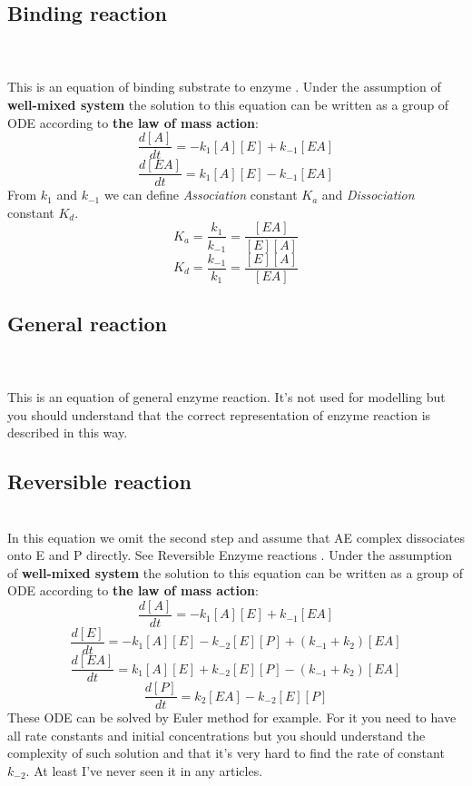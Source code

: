 \documentclass[twoside,twocolumn]{article}
\begin{document}
\subsection{Binding reaction}
\label{subsec:enzyme_binding}
\\\\This is an equation of binding substrate to enzyme \cite[p.~135]{sterratt_principles_2011}. Under the assumption of \textbf{well-mixed system}\cite[p.~135]{sterratt_principles_2011} the solution to this equation can be written as a group of ODE according to \textbf{the law of mass action}\cite[p.~10]{bisswanger_enzyme_2002}:
\[ \frac{d[A]}{dt} = -k_{1}[A][E] + k_{-1}[EA]\]
\[ \frac{d[EA]}{dt} = k_{1}[A][E] - k_{-1}[EA]\]
From $k_{1}$ and $k_{-1}$ we can define \textit{Association} constant $K_{a}$ and \textit{Dissociation} constant $K_{d}$.
\[ K_{a} = \frac{k_{1}}{k_{-1}} = \frac{[EA]}{[E][A]} \]
\[ K_{d} = \frac{k_{-1}}{k_{1}} = \frac{[E][A]}{[EA]} \]

\subsection{General reaction}
\label{subsec:enzyme_general}
\\\\This is an equation of general enzyme reaction. It's not used for modelling but you should understand that the correct representation of enzyme reaction is described in this way. 

\subsection{Reversible reaction}
\label{subsec:enzyme_reversible}
\\In this equation we omit the second step and assume that AE complex dissociates onto E and P directly. See Reversible Enzyme reactions \cite[p.~75]{bisswanger_enzyme_2002}. Under the assumption of \textbf{well-mixed system} the solution to this equation can be written as a group of ODE according to \textbf{the law of mass action}:
\[ \frac{d[A]}{dt} = -k_{1}[A][E] + k_{-1}[EA]\]
\[ \frac{d[E]}{dt} = -k_{1}[A][E] - k_{-2}[E][P] + (k_{-1} + k_{2})[EA]\]
\[ \frac{d[EA]}{dt} = k_{1}[A][E] + k_{-2}[E][P] - (k_{-1} + k_{2})[EA]\]
\[ \frac{d[P]}{dt} = k_{2}[EA] - k_{-2}[E][P]\]
These ODE can be solved by Euler method for example. For it you need to have all rate constants and initial concentrations but you should understand the complexity of such solution and that it's very hard to find the rate of constant $k_{-2}$. At least I've never seen it in any articles.
\end{document}
